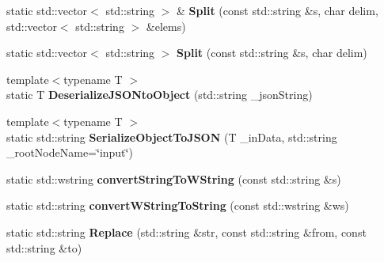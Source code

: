 \begin{DoxyCompactItemize}
\item 
static std\+::vector$<$ std\+::string $>$ \& {\bfseries Split} (const std\+::string \&s, char delim, std\+::vector$<$ std\+::string $>$ \&elems)\hypertarget{classnetxpert_1_1utils_1_1UTILS_a6de9d330b1ba37ee4f00d1229bd3f2b1}{}\label{classnetxpert_1_1utils_1_1UTILS_a6de9d330b1ba37ee4f00d1229bd3f2b1}

\item 
static std\+::vector$<$ std\+::string $>$ {\bfseries Split} (const std\+::string \&s, char delim)\hypertarget{classnetxpert_1_1utils_1_1UTILS_a0024bea6b90e82c85e436ca366ab54c6}{}\label{classnetxpert_1_1utils_1_1UTILS_a0024bea6b90e82c85e436ca366ab54c6}

\item 
{\footnotesize template$<$typename T $>$ }\\static T {\bfseries Deserialize\+J\+S\+O\+Nto\+Object} (std\+::string \+\_\+json\+String)\hypertarget{classnetxpert_1_1utils_1_1UTILS_a48e234571d9187affb93de9fd137bec4}{}\label{classnetxpert_1_1utils_1_1UTILS_a48e234571d9187affb93de9fd137bec4}

\item 
{\footnotesize template$<$typename T $>$ }\\static std\+::string {\bfseries Serialize\+Object\+To\+J\+S\+ON} (T \+\_\+in\+Data, std\+::string \+\_\+root\+Node\+Name=\char`\"{}input\char`\"{})\hypertarget{classnetxpert_1_1utils_1_1UTILS_a9b8ad3ed8655cc589d935d6a2f8b524a}{}\label{classnetxpert_1_1utils_1_1UTILS_a9b8ad3ed8655cc589d935d6a2f8b524a}

\item 
static std\+::wstring {\bfseries convert\+String\+To\+W\+String} (const std\+::string \&s)\hypertarget{classnetxpert_1_1utils_1_1UTILS_a8be364101776edd0371a6d1ac2990266}{}\label{classnetxpert_1_1utils_1_1UTILS_a8be364101776edd0371a6d1ac2990266}

\item 
static std\+::string {\bfseries convert\+W\+String\+To\+String} (const std\+::wstring \&ws)\hypertarget{classnetxpert_1_1utils_1_1UTILS_a7d704cac4e1cc8e025a1cf7f730d0f34}{}\label{classnetxpert_1_1utils_1_1UTILS_a7d704cac4e1cc8e025a1cf7f730d0f34}

\item 
static std\+::string {\bfseries Replace} (std\+::string \&str, const std\+::string \&from, const std\+::string \&to)\hypertarget{classnetxpert_1_1utils_1_1UTILS_ac027e782541fb700dd1bf8aa7c9283bd}{}\label{classnetxpert_1_1utils_1_1UTILS_ac027e782541fb700dd1bf8aa7c9283bd}


\end{DoxyCompactItemize}
